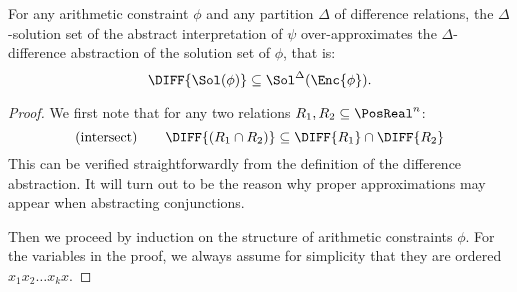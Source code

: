 \documentclass[a4paper,10pt]{article}
\begin{document}
\begin{theorem}[Soundness]
For any arithmetic constraint $\phi$ and any partition $\Delta$ of
difference relations, the $\Delta$-solution set of the abstract
interpretation of $\psi$ over-approximates the $\Delta$-difference 
abstraction of the solution set of $\phi$, that is:
\label{theo}
 $$\DIFF{\Sol(\phi)} \subseteq \Sol^\Delta(\Enc{\phi}).$$
\end{theorem}

\begin{proof} We first note that for any two relations
$R_1,R_2\subseteq
  \PosReal^n$:
$$\text{(intersect)}\qquad \DIFF{(R_1\cap R_2)}\subseteq \DIFF{R_1}\cap
\DIFF{R_2}$$
This can be verified straightforwardly from the definition
of the difference abstraction. It will turn out to be the 
reason why proper approximations may appear when 
abstracting conjunctions.

Then we proceed by induction on the structure of arithmetic
constraints $\phi$. For the variables in the proof, we always 
assume for simplicity that they are ordered $x_1 x_2\ldots x_k x$.



\end{proof}
\end{document}
